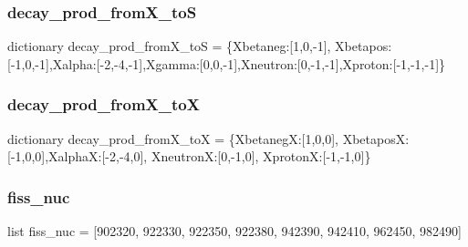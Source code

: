 \subsubsection{\texorpdfstring{decay\+\_\+prod\+\_\+from\+X\+\_\+toS}{decay\_prod\_fromX\_toS}}
{\footnotesize\ttfamily dictionary decay\+\_\+prod\+\_\+from\+X\+\_\+toS = \{\textquotesingle{}Xbetaneg\textquotesingle{}\+:\mbox{[}1,0,-\/1\mbox{]}, \textquotesingle{}Xbetapos\textquotesingle{}\+:\mbox{[}-\/1,0,-\/1\mbox{]},\textquotesingle{}Xalpha\textquotesingle{}\+:\mbox{[}-\/2,-\/4,-\/1\mbox{]},\textquotesingle{}Xgamma\textquotesingle{}\+:\mbox{[}0,0,-\/1\mbox{]},\textquotesingle{}Xneutron\textquotesingle{}\+:\mbox{[}0,-\/1,-\/1\mbox{]},\textquotesingle{}Xproton\textquotesingle{}\+:\mbox{[}-\/1,-\/1,-\/1\mbox{]}\}}

\mbox{\label{namespaceopenbu_1_1data_1_1list__and__dict_a334307eb1d0b16eadf7a573a81796735}} 
\subsubsection{\texorpdfstring{decay\+\_\+prod\+\_\+from\+X\+\_\+toX}{decay\_prod\_fromX\_toX}}
{\footnotesize\ttfamily dictionary decay\+\_\+prod\+\_\+from\+X\+\_\+toX = \{\textquotesingle{}XbetanegX\textquotesingle{}\+:\mbox{[}1,0,0\mbox{]}, \textquotesingle{}XbetaposX\textquotesingle{}\+:\mbox{[}-\/1,0,0\mbox{]},\textquotesingle{}XalphaX\textquotesingle{}\+:\mbox{[}-\/2,-\/4,0\mbox{]}, \textquotesingle{}XneutronX\textquotesingle{}\+:\mbox{[}0,-\/1,0\mbox{]}, \textquotesingle{}XprotonX\textquotesingle{}\+:\mbox{[}-\/1,-\/1,0\mbox{]}\}}

\mbox{\label{namespaceopenbu_1_1data_1_1list__and__dict_a65fda40ad2531fc5a84632b135ba3965}} 
\subsubsection{\texorpdfstring{fiss\+\_\+nuc}{fiss\_nuc}}
{\footnotesize\ttfamily list fiss\+\_\+nuc = \mbox{[}\textquotesingle{}902320\textquotesingle{}, \textquotesingle{}922330\textquotesingle{}, \textquotesingle{}922350\textquotesingle{}, \textquotesingle{}922380\textquotesingle{}, \textquotesingle{}942390\textquotesingle{}, \textquotesingle{}942410\textquotesingle{}, \textquotesingle{}962450\textquotesingle{}, \textquotesingle{}982490\textquotesingle{}\mbox{]}}

